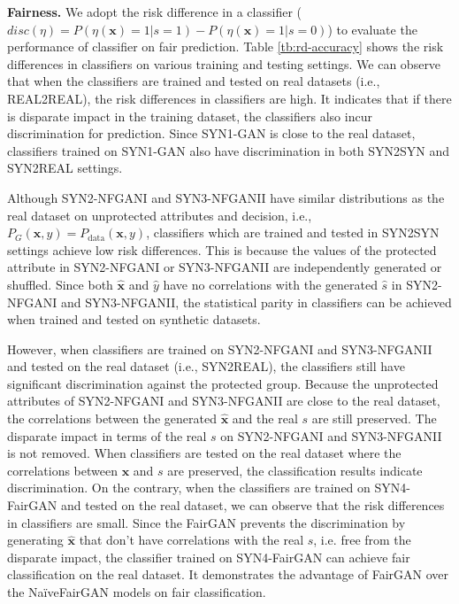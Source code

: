 \documentclass[sigconf]{acmart}
\theoremstyle{definition}
\begin{document}
{\bf \noindent Fairness.}
We adopt the risk difference in a classifier ($disc(\eta) = P(\eta(\mathbf{x})=1|s=1)-P(\eta(\mathbf{x})=1|s=0)$) to evaluate the performance of classifier on fair prediction. Table \ref{tb:rd-accuracy} shows the risk differences in classifiers on various training and testing settings. We can observe that when the classifiers are trained and tested on real datasets (i.e., REAL2REAL), the risk differences in classifiers are high. It indicates that if there is disparate impact in the training dataset, the classifiers also incur discrimination for prediction. Since SYN1-GAN is close to the real dataset, classifiers trained on SYN1-GAN also have discrimination in both SYN2SYN and SYN2REAL settings. 

Although SYN2-NFGANI and SYN3-NFGANII have similar distributions as the real dataset on unprotected attributes and decision, i.e., $P_G(\mathbf{x}, y)=P_{\text{data}}(\mathbf{x}, y)$, classifiers which are trained and tested in SYN2SYN settings achieve low risk differences. This is because the values of the protected attribute in SYN2-NFGANI or SYN3-NFGANII are independently generated or shuffled. Since both $\hat{\mathbf{x}}$ and  $\hat{y}$ have no correlations with the generated $\hat{s}$ in SYN2-NFGANI and SYN3-NFGANII, the statistical parity in classifiers can be achieved when trained and tested on synthetic datasets. 

However, when classifiers are trained on SYN2-NFGANI and SYN3-NFGANII and tested on the real dataset (i.e., SYN2REAL), the classifiers still have significant discrimination against the protected group. Because the unprotected attributes of SYN2-NFGANI and SYN3-NFGANII are close to the real dataset, the correlations between the generated $\hat{\mathbf{x}}$ and the real $s$ are still preserved. The disparate impact in terms of the real $s$ on SYN2-NFGANI and SYN3-NFGANII is not removed. When classifiers are tested on the real dataset where the correlations between $\mathbf{x}$ and $s$ are preserved, the classification results indicate discrimination. On the contrary, when the classifiers are trained on SYN4-FairGAN and tested on the real dataset, we can observe that the risk differences in classifiers are small. Since the FairGAN prevents the discrimination by generating  $\hat{\mathbf{x}}$ that don't have correlations with the real $s$, i.e. free from the disparate impact, the classifier trained on SYN4-FairGAN can achieve fair classification on the real dataset. It demonstrates the advantage of FairGAN over the Na\"iveFairGAN models on fair classification.
\end{document}
